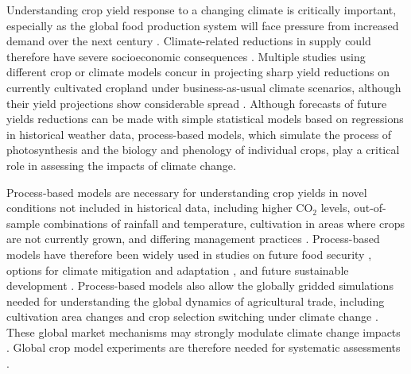 \documentclass[gmd, manuscript]{copernicus} %
\begin{document}
\introduction
\label{S:1}
Understanding crop yield response to a changing climate is critically important, especially as the global food production system will face pressure from increased demand over the next century \citep{bodirsky2015}. 
Climate-related reductions in supply could therefore have severe socioeconomic consequences \citep[e.g.][]{Stevanovic2016,Wiebe_2015}. 
Multiple studies using different crop or climate models concur in projecting sharp yield reductions on currently cultivated cropland under {business-as-usual} climate scenarios, although their yield projections show considerable spread \citep[e.g.][and references therein]{Rosenzweig2014, Schauberger2017, porter2014}. 
Although forecasts of future yields reductions can be made with simple statistical models based on regressions in historical weather data, process-based models, which simulate the process of photosynthesis and the biology and phenology of individual crops, play a critical role in assessing the impacts of climate change.

Process-based models are necessary for understanding crop yields in novel conditions not included in historical data, including higher CO$_2$ levels, out-of-sample combinations of rainfall and temperature, cultivation in areas where crops are not currently grown, and differing management practices \citep[e.g.][]{pugh_climate_2016, Roberts2017,minoli2019modelling}. Process-based models have therefore been widely used in studies on future food security \citep{wheeler2013climate}, options for climate mitigation \citep{muller2015} and adaptation \citep{challinor2018improving}, and future sustainable development \citep{humpenoder2018large}.
Process-based models also allow the globally gridded simulations needed for understanding 
the global dynamics of agricultural trade, including  cultivation area changes and crop selection switching under climate change  \citep{rosenzweig2018,ruane2018}. These global market mechanisms may strongly modulate climate change impacts \citep{Stevanovic2016,hasegawa2018risk}.
Global crop model experiments are therefore needed for systematic assessments \citep{muller_global_2017}.

\end{document}
